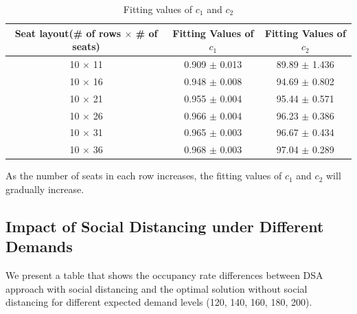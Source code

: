 \begin{table}[ht]
  \centering
  \caption{Fitting values of $c_1$ and $c_2$}
  \begin{tabular}{|c|c|c|}
  \hline
   Seat layout(\# of rows $\times$ \# of seats) & Fitting Values of $c_1$ & Fitting Values of $c_2$  \\
  \hline
   10 $\times$ 11 & 0.909 $\pm$ 0.013  & 89.89 $\pm$ 1.436 \\
   10 $\times$ 16 & 0.948 $\pm$ 0.008  & 94.69 $\pm$ 0.802 \\
   10 $\times$ 21 & 0.955 $\pm$ 0.004 & 95.44 $\pm$ 0.571 \\
   10 $\times$ 26 & 0.966 $\pm$ 0.004 & 96.23 $\pm$ 0.386 \\
   10 $\times$ 31 & 0.965 $\pm$ 0.003 & 96.67 $\pm$ 0.434 \\
   10 $\times$ 36 & 0.968 $\pm$ 0.003 & 97.04 $\pm$ 0.289 \\
   \hline
  \end{tabular}
\end{table}

As the number of seats in each row increases, the fitting values of $c_1$ and $c_2$ will gradually increase.

\subsection{Impact of Social Distancing under Different Demands}
We present a table that shows the occupancy rate differences between DSA approach with social distancing and the optimal solution without social distancing for different expected demand levels (120, 140, 160, 180, 200).

